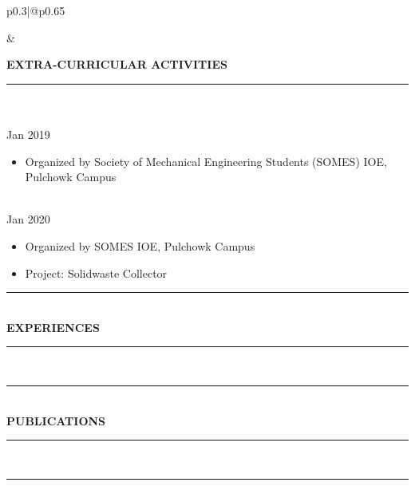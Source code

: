 \documentclass[12pt,a4paper]{article}
\newcommand{\myline}[1]{\rule{#1}{1.0pt}\\}
\newcommand{\topic}[1]{\textbf{\Large\selectfont\MakeUppercase{#1}}\\\vspace{-0.5cm}\myline{1.0cm}}
\newcommand{\subtopic}[1]{\textbf{\normalsize\selectfont{#1}}\\}
\begin{document}
\begin{multicols}{2}
\setlength{\arrayrulewidth}{1pt} %
\noindent\begin{tabular}{p{0.3\textwidth}|@{\hspace{5mm}}p{0.65\textwidth}}

{
\begin{flushleft}
\end{flushleft}
}
&
{
\begin{flushleft}
    \topic{extra-curricular activities}
    \subtopic{Volunteer, MECHTRIX X}

    Jan 2019
    \begin{itemize}
        \item  Organized by Society of Mechanical Engineering Students (SOMES) IOE, Pulchowk Campus
    \end{itemize}
    
 \subtopic{Volunteer and Participation,MECHTRIX 2020}
 Jan 2020
    \begin{itemize}
        \item Organized by SOMES IOE, Pulchowk Campus
        \item Project: Solidwaste Collector
    \end{itemize}
    

    
    \textcolor{gray!50}{\rule{\linewidth}{0.5pt}}\\
    \topic{Experiences}


    \textcolor{gray!50}{\rule{\linewidth}{0.5pt}}\\
    \topic{Publications}
    
    
  \textcolor{gray!50}{\rule{\linewidth}{0.5pt}}\\
\end{flushleft}
}
\end{tabular}
\end{multicols}
\end{document}
